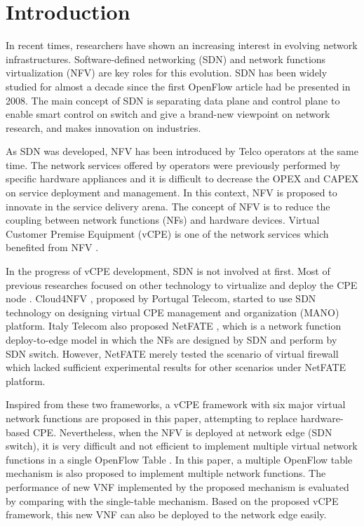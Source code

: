 \documentclass[conference]{IEEEtran}
\begin{document}
\IEEEpeerreviewmaketitle{}





\section{Introduction}
In recent times, researchers have shown an increasing interest in evolving network infrastructures.
Software-defined networking (SDN) and network functions virtualization (NFV) are key roles for this evolution.
SDN \cite{sdn-mckeown-2009-talk, sdn-newnorm, sdn-road, sdn-compre-survey} has been widely studied for almost a decade since the first OpenFlow \cite{openflow-mckeown-2008, openflow-spec} article had be presented in 2008.
The main concept of SDN is separating data plane and control plane to enable smart control on switch and give a brand-new viewpoint on network research, and makes innovation on industries.

As SDN was developed, NFV \cite{nfv-wp, etsi-nfv-archi, nfv-survey} has been introduced by Telco operators at the same time.
The network services offered by operators were previously performed by specific hardware appliances and it is difficult to decrease the OPEX and CAPEX on service deployment and management.
In this context, NFV is proposed to innovate in the service delivery arena.
The concept of NFV is to reduce the coupling between network functions (NFs) and hardware devices.
Virtual Customer Premise Equipment (vCPE) \cite{nec-vcpe, vcpe-enhance} is one of the network services which benefited from NFV \cite{etsi-nfv-usecase}.

In the progress of vCPE development, SDN is not involved at first.
Most of previous researches focused on other technology to virtualize and deploy the CPE node \cite{virtual-rg, security-vgw, design-vrgw, nfv-hgw-surrogate, linux-cpe, nfv-resoure-contrain-cpe}.
Cloud4NFV \cite{cloud4nfv, cloud4nfv-telco}, proposed by Portugal Telecom, started to use SDN technology on designing virtual CPE management and organization (MANO) platform.
Italy Telecom also proposed NetFATE \cite{netfate}, which is a network function deploy-to-edge model in which the NFs are designed by SDN and perform by SDN switch. However, NetFATE merely tested the scenario of virtual firewall which lacked sufficient experimental results for other scenarios under NetFATE platform.

Inspired from these two frameworks, a vCPE framework with six major virtual network functions are proposed in this paper, attempting to replace hardware-based CPE.
Nevertheless, when the NFV is deployed at network edge (SDN switch), it is very difficult and not efficient to implement multiple virtual network functions in a single OpenFlow Table \cite{multiple-flow-table}. In this paper, a multiple OpenFlow table mechanism is also proposed to implement multiple network functions. The performance of new VNF implemented by the proposed mechanism is evaluated by comparing with the single-table mechanism. Based on the proposed vCPE framework, this new VNF can also be deployed to the network edge easily.
\end{document}
